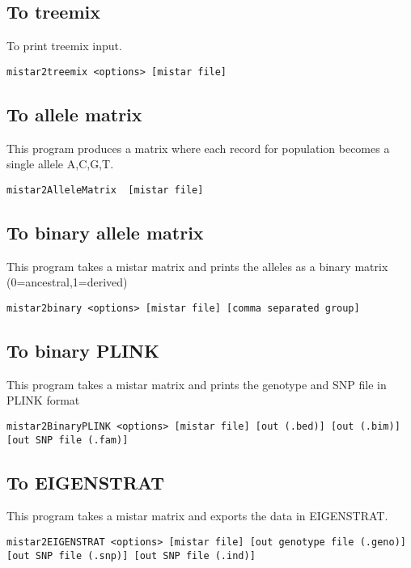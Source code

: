 \documentclass[a4paper]{article}
\begin{document}
\subsection{To treemix}

To print treemix input.
\begin{lstlisting}
mistar2treemix <options> [mistar file]
\end{lstlisting}

\subsection{To allele matrix}

\noindent This program produces a matrix where each record for population becomes a single allele {A,C,G,T}.
\begin{lstlisting}
mistar2AlleleMatrix  [mistar file]
\end{lstlisting}


\subsection{To binary allele matrix}

\noindent This program takes a mistar matrix and prints the alleles as a binary matrix (0=ancestral,1=derived)

\begin{lstlisting}
mistar2binary <options> [mistar file] [comma separated group]
\end{lstlisting}

\subsection{To binary PLINK}

\noindent This program takes a mistar matrix and prints the genotype and SNP file in PLINK format

\tiny
\begin{lstlisting}
mistar2BinaryPLINK <options> [mistar file] [out (.bed)] [out (.bim)] [out SNP file (.fam)]
\end{lstlisting}
\normalsize

\subsection{To EIGENSTRAT}
\noindent This program takes a mistar matrix and exports the data in EIGENSTRAT.
\tiny
\begin{lstlisting}
mistar2EIGENSTRAT <options> [mistar file] [out genotype file (.geno)] [out SNP file (.snp)] [out SNP file (.ind)]
\end{lstlisting}
\normalsize
\end{document}
